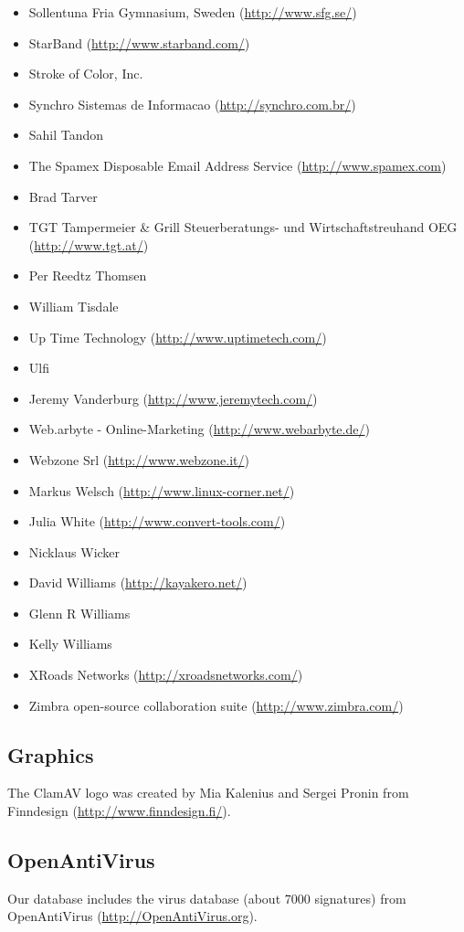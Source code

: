 \documentclass[a4paper,titlepage,12pt]{article}
\begin{document}
\begin{itemize}
	\item Sollentuna Fria Gymnasium, Sweden (\url{http://www.sfg.se/})
	\item StarBand (\url{http://www.starband.com/})
	\item Stroke of Color, Inc.
	\item Synchro Sistemas de Informacao (\url{http://synchro.com.br/})
	\item Sahil Tandon
	\item The Spamex Disposable Email Address Service (\url{http://www.spamex.com})
	\item Brad Tarver
	\item TGT Tampermeier \& Grill Steuerberatungs- und Wirtschaftstreuhand OEG (\url{http://www.tgt.at/})
	\item Per Reedtz Thomsen
	\item William Tisdale
	\item Up Time Technology (\url{http://www.uptimetech.com/})
	\item Ulfi
	\item Jeremy Vanderburg (\url{http://www.jeremytech.com/})
	\item Web.arbyte - Online-Marketing (\url{http://www.webarbyte.de/})
	\item Webzone Srl (\url{http://www.webzone.it/})
	\item Markus Welsch (\url{http://www.linux-corner.net/})
	\item Julia White (\url{http://www.convert-tools.com/})
	\item Nicklaus Wicker
	\item David Williams (\url{http://kayakero.net/})
	\item Glenn R Williams
	\item Kelly Williams
	\item XRoads Networks (\url{http://xroadsnetworks.com/})
	\item Zimbra open-source collaboration suite (\url{http://www.zimbra.com/})
    \end{itemize}

    \subsection{Graphics}
    The ClamAV logo was created by Mia Kalenius and Sergei Pronin from
    Finndesign (\url{http://www.finndesign.fi/}).

    \subsection{OpenAntiVirus}
    Our database includes the virus database (about 7000 signatures) from
    OpenAntiVirus (\url{http://OpenAntiVirus.org}).
\end{document}
